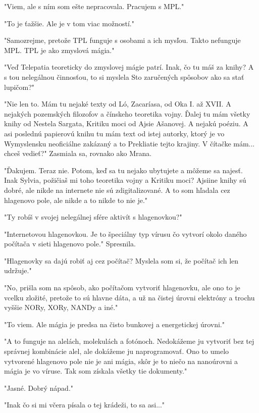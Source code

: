 \documentclass{book}
\begin{document}
"$ $Viem, ale s ním som ešte nepracovala. Pracujem s MPL."$ $ 

"$ $To je ťažšie. Ale je v tom viac možností."$ $ 

"$ $Samozrejme, pretože TPL funguje s osobami a ich mysľou. Takto nefunguje MPL. TPL je ako zmyslová mágia."$ $ 

"$ $Veď Telepatia teoreticky do zmyslovej mágie patrí. Inak, čo tu máš za knihy? A s tou nelegálnou činnosťou, to si myslela Sto zaručených spôsobov ako sa stať lupičom?"$ $ 

"$ $Nie len to. Mám tu nejaké texty od Ló, Zacaríasa, od Oka I. až XVII. A nejakých pozemských filozofov a čínskeho teoretika vojny. Ďalej tu mám všetky knihy od Nestela Sargata, Kritiku moci od Ajsie Ašanovej. A nejakú poéziu. A asi poslednú papierovú knihu tu mám text od istej autorky, ktorý je vo Wymyslensku neoficiálne zakázaný a to Prekliatie tejto krajiny. V čítačke mám... chceš vedieť?"$ $  Zasmiala sa, rovnako ako Mrana.

"$ $Ďakujem. Teraz nie. Potom, keď sa tu nejako ubytujete a môžeme sa najesť. Inak Sylvia, požičiaš mi toho teoretika vojny a Kritiku moci? Ajsiine knihy sú dobré, ale nikde na internete nie sú zdigitalizované. A to som hľadala cez hlagenovo pole, ale nikde a to nikde to nie je."$ $ 

"$ $Ty robíš v svojej nelegálnej sfére aktivít s hlagenovkou?"$ $ 

"$ $Internetovou hlagenovkou. Je to špeciálny typ vírusu čo vytvorí okolo daného počítača v sieti hlagenovo pole."$ $  Spresnila.

"$ $Hlagenovky sa dajú robiť aj cez počítač? Myslela som si, že počítač ich len udržuje."$ $ 

"$ $No, prišla som na spôsob, ako počítačom vytvoriť hlagenovku, ale ono to je vcelku zložité, pretože to sú hlavne dáta, a už na čistej úrovni elektróny a trochu vyššie NORy, XORy, NANDy a iné."$ $ 

"$ $To viem. Ale mágia je predsa na čisto bunkovej a energetickej úrovni."$ $ 

"$ $A to funguje na alelách, molekulách a fotónoch. Nedokážeme ju vytvoriť bez tej správnej kombinácie alel, ale dokážeme ju naprogramovať. Ono to umelo vytvorené hlagenovo pole nie je ani mágia, skôr je to niečo na nanoúrovni a mágia je vo víruse. Tak som získala všetky tie dokumenty."$ $ 

"$ $Jasné. Dobrý nápad."$ $ 

"$ $Inak čo si mi včera písala o tej krádeži, to sa asi..."$ $ 
\end{document}
